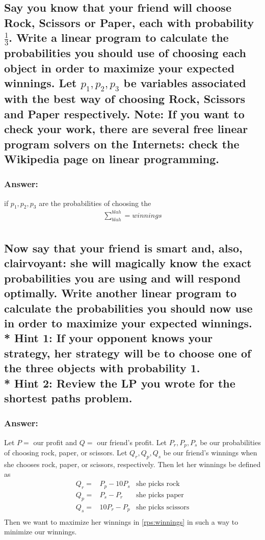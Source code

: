 \documentclass[titlepage]{article}\usepackage[]{graphicx}\usepackage[]{color}
\begin{document}
  \subsection{Say you know that your friend will choose Rock, Scissors or
        Paper, each with probability $\frac{1}{3}$. Write a linear program to
        calculate the probabilities you should use of choosing each object in
        order to maximize your expected winnings. Let $p_1,p_2,p_3$ be variables
        associated with the best way of choosing Rock, Scissors and Paper
        respectively. Note: If you want to check your work, there are several free
        linear program solvers on the Internets: check the Wikipedia page on linear
        programming.} 
  \subsubsection{Answer:}
  if $p_1, p_2, p_3$ are the probabilities of choosing the 
  \begin{align}
    \label{rps:a}
    \sum_{blah}^{blah} = winnings \\
  \end{align}



  \subsection{Now say that your friend is smart and, also,
        clairvoyant: she will magically know the exact probabilities you are
        using and will respond optimally. Write another linear program to
        calculate the probabilities you should now use in order to maximize your
        expected winnings. \\* Hint 1: If your opponent knows your strategy, her
        strategy will be to choose one of the three objects with probability 1.
      \\* Hint 2: Review the LP you wrote for the shortest paths problem.}
  \subsubsection{Answer:}
  Let $P = $ our profit and $Q = $ our friend's profit. Let $P_r, P_p, P_s$ be
  our probabilities of choosing rock, paper, or scissors. Let $Q_r, Q_p, Q_s$
  be our friend's winnings when she chooses rock, paper, or scissors,
  respectively.
  Then let her winnings  be defined as
  \begin{equation}
    \begin{aligned}
      Q_r =& P_p - 10P_s &\text{she picks rock} \\
      Q_p =& P_s - P_r   &\text{she picks paper} \\
      Q_s =& 10P_r - P_p &\text{she picks scissors} \\
    \end{aligned}
    \label{rps:winnings}
  \end{equation}
  Then we want to maximize her winnings in \ref{rps:winnings} in such a way to
  minimize our winnings. 
\end{document}
